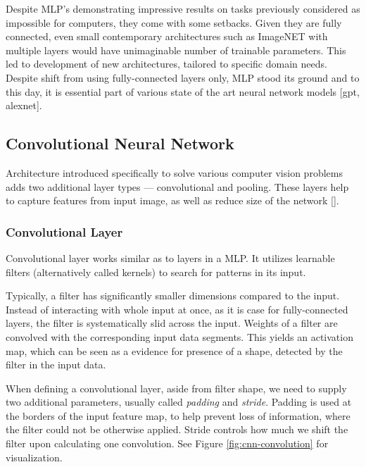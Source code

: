 Despite MLP's demonstrating impressive results on tasks previously considered as impossible for computers, they come with some setbacks. Given they are fully connected, even small contemporary architectures such as ImageNET with multiple layers would have unimaginable number of trainable parameters. This led to development of new architectures, tailored to specific domain needs. Despite shift from using fully-connected layers only, MLP stood its ground and to this day, it is essential part of various state of the art neural network models [gpt, alexnet].

\subsection{Convolutional Neural Network}
Architecture introduced specifically to solve various computer vision problems adds two additional layer types --- convolutional and pooling. These layers help to capture features from input image, as well as reduce size of the network []. 


\subsubsection{Convolutional Layer}

Convolutional layer works similar as to layers in a MLP. It utilizes learnable filters (alternatively called kernels) to search for patterns in its input.

Typically, a filter has significantly smaller dimensions compared to the input. Instead of interacting with whole input at once, as it is case for fully-connected layers, the filter is systematically slid across the input. Weights of a filter are convolved with the corresponding input data segments. This yields an activation map, which can be seen as a evidence for presence of a shape, detected by the filter in the input data.

When defining a convolutional layer, aside from filter shape, we need to supply two additional parameters, usually called \emph{padding} and \emph{stride}. Padding is used at the borders of the input feature map, to help prevent loss of information, where the filter could not be otherwise applied. Stride controls how much we shift the filter upon calculating one convolution. See Figure \ref{fig:cnn-convolution} for visualization.

